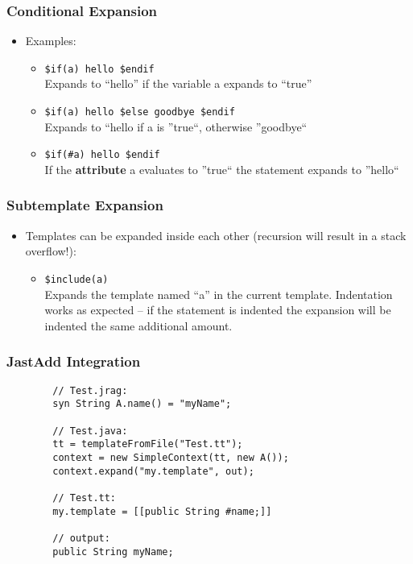 \documentclass[a4paper,12pt,presentation]{beamer}
\begin{document}
\begin{frame}[fragile]
    \frametitle{Conditional Expansion}
    \begin{itemize}
        \item Examples:
            \begin{itemize}
                \item \verb'$if(a) hello $endif' \\
                    Expands to ``hello'' if
                    the variable a expands to ``true''
                \item \verb'$if(a) hello $else goodbye $endif' \\
                    Expands to
                    ``hello if a is ''true``, otherwise ''goodbye``
                \item \verb'$if(#a) hello $endif' \\
                    If the {\bf attribute} a
                    evaluates to ''true`` the statement expands to ''hello``
            \end{itemize}
    \end{itemize}
\end{frame}

\begin{frame}[fragile]
    \frametitle{Subtemplate Expansion}
    \begin{itemize}
        \item Templates can be expanded inside each other (recursion will
            result in a stack overflow!):
            \begin{itemize}
                \item \verb'$include(a)' \\
                    Expands the template named ``a'' in the current template.
                    Indentation works as expected -- if the statement is
                    indented the expansion will be indented the same additional
                    amount.
            \end{itemize}
    \end{itemize}
\end{frame}

\begin{frame}[fragile]
    \frametitle{JastAdd Integration}

    \begin{verbatim}
        // Test.jrag:
        syn String A.name() = "myName";

        // Test.java:
        tt = templateFromFile("Test.tt");
        context = new SimpleContext(tt, new A());
        context.expand("my.template", out);

        // Test.tt:
        my.template = [[public String #name;]]

        // output:
        public String myName;
    \end{verbatim}
\end{frame}
\end{document}
